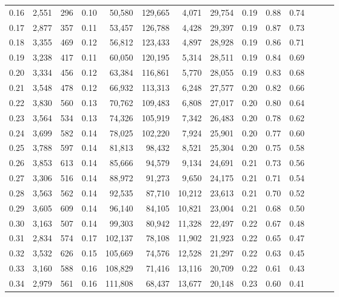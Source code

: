 \begin{tabular}{rrrrrrrrrrrrrr}
0.16 &  2,551 &  296 &  0.10 &   50,580 &  129,665 &   4,071 &  29,754 &  0.19 &  0.88 &      0.74 \\
0.17 &  2,877 &  357 &  0.11 &   53,457 &  126,788 &   4,428 &  29,397 &  0.19 &  0.87 &      0.73 \\
0.18 &  3,355 &  469 &  0.12 &   56,812 &  123,433 &   4,897 &  28,928 &  0.19 &  0.86 &      0.71 \\
0.19 &  3,238 &  417 &  0.11 &   60,050 &  120,195 &   5,314 &  28,511 &  0.19 &  0.84 &      0.69 \\
0.20 &  3,334 &  456 &  0.12 &   63,384 &  116,861 &   5,770 &  28,055 &  0.19 &  0.83 &      0.68 \\
0.21 &  3,548 &  478 &  0.12 &   66,932 &  113,313 &   6,248 &  27,577 &  0.20 &  0.82 &      0.66 \\
0.22 &  3,830 &  560 &  0.13 &   70,762 &  109,483 &   6,808 &  27,017 &  0.20 &  0.80 &      0.64 \\
0.23 &  3,564 &  534 &  0.13 &   74,326 &  105,919 &   7,342 &  26,483 &  0.20 &  0.78 &      0.62 \\
0.24 &  3,699 &  582 &  0.14 &   78,025 &  102,220 &   7,924 &  25,901 &  0.20 &  0.77 &      0.60 \\
0.25 &  3,788 &  597 &  0.14 &   81,813 &   98,432 &   8,521 &  25,304 &  0.20 &  0.75 &      0.58 \\
0.26 &  3,853 &  613 &  0.14 &   85,666 &   94,579 &   9,134 &  24,691 &  0.21 &  0.73 &      0.56 \\
0.27 &  3,306 &  516 &  0.14 &   88,972 &   91,273 &   9,650 &  24,175 &  0.21 &  0.71 &      0.54 \\
0.28 &  3,563 &  562 &  0.14 &   92,535 &   87,710 &  10,212 &  23,613 &  0.21 &  0.70 &      0.52 \\
0.29 &  3,605 &  609 &  0.14 &   96,140 &   84,105 &  10,821 &  23,004 &  0.21 &  0.68 &      0.50 \\
0.30 &  3,163 &  507 &  0.14 &   99,303 &   80,942 &  11,328 &  22,497 &  0.22 &  0.67 &      0.48 \\
0.31 &  2,834 &  574 &  0.17 &  102,137 &   78,108 &  11,902 &  21,923 &  0.22 &  0.65 &      0.47 \\
0.32 &  3,532 &  626 &  0.15 &  105,669 &   74,576 &  12,528 &  21,297 &  0.22 &  0.63 &      0.45 \\
0.33 &  3,160 &  588 &  0.16 &  108,829 &   71,416 &  13,116 &  20,709 &  0.22 &  0.61 &      0.43 \\
0.34 &  2,979 &  561 &  0.16 &  111,808 &   68,437 &  13,677 &  20,148 &  0.23 &  0.60 &      0.41 \\

\end{tabular}
